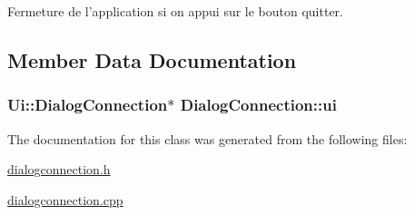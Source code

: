 Fermeture de l'application si on appui sur le bouton quitter. 

\subsection{Member Data Documentation}
\hypertarget{class_dialog_connection_a4c9aa836477a3ad409caf4bb654d3f04}{
\subsubsection[{ui}]{\setlength{\rightskip}{0pt plus 5cm}Ui\-::\-Dialog\-Connection$\ast$ Dialog\-Connection\-::ui\hspace{0.3cm}{\ttfamily [private]}}}\label{class_dialog_connection_a4c9aa836477a3ad409caf4bb654d3f04}


The documentation for this class was generated from the following files\-:\begin{DoxyCompactItemize}
\item 
\hyperlink{dialogconnection_8h}{dialogconnection.\-h}\item 
\hyperlink{dialogconnection_8cpp}{dialogconnection.\-cpp}\end{DoxyCompactItemize}
